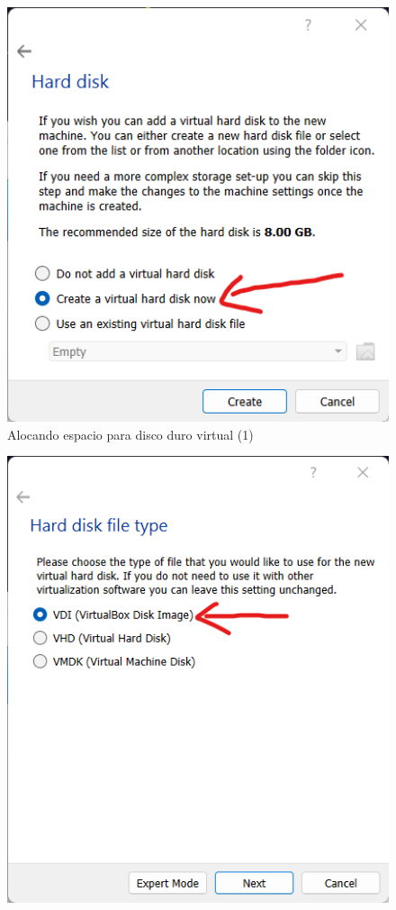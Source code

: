 \documentclass[stu, 12pt, letterpaper, donotrepeattitle, floatsintext, natbib, helv]{apa7}
\begin{document}
\begin{enumerate}
\begin{figure} [H]
        \includegraphics[width = 1\textwidth]{VirtualHardDiskCreation1.png}
        \caption{Alocando espacio para disco duro virtual (1)}
        \label{fig:VHDD1}
    \end{figure}
    \begin{figure}[H]
        \includegraphics[width = 1\textwidth]{VirtualHardDiskCreation2.png} \\

\end{figure}
\end{enumerate}
\end{document}
